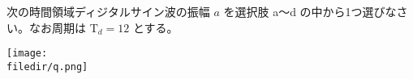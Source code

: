 次の時間領域ディジタルサイン波の振幅 $a$ を選択肢 a〜d の中から1つ選びなさい。なお周期は $\textrm{T}_d = 12$ とする。

\centering\texttt{[image: \\filedir/q.png]}
